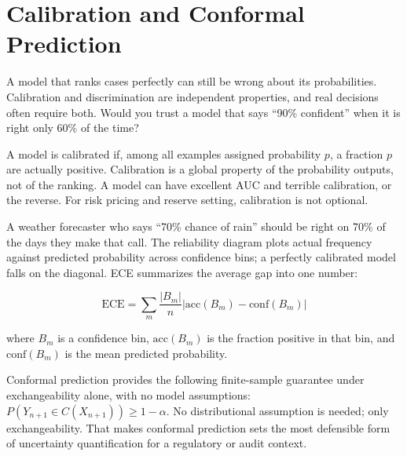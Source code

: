 \documentclass[12pt,a4paper]{article}
\begin{document}
\section*{Calibration and Conformal Prediction}

A model that ranks cases perfectly can still be wrong about its
probabilities. Calibration and discrimination are independent properties,
and real decisions often require both. Would you trust a model that says
``90\% confident'' when it is right only 60\% of the time?

\begin{concept}
A model is calibrated if, among all examples assigned probability $p$,
a fraction $p$ are actually positive. Calibration is a global property
of the probability outputs, not of the ranking. A model can have excellent
AUC and terrible calibration, or the reverse. For risk pricing and
reserve setting, calibration is not optional.
\end{concept}

\begin{analogy}
A weather forecaster who says ``70\% chance of rain'' should be right
on 70\% of the days they make that call. The reliability diagram plots
actual frequency against predicted probability across confidence bins;
a perfectly calibrated model falls on the diagonal. ECE summarizes the
average gap into one number:
\end{analogy}

\begin{equation*}
  \mathrm{ECE}
  = \sum_{m} \frac{|B_m|}{n}
    \left|\mathrm{acc}(B_m) - \mathrm{conf}(B_m)\right|
\end{equation*}

where $B_m$ is a confidence bin, $\mathrm{acc}(B_m)$ is the fraction
positive in that bin, and $\mathrm{conf}(B_m)$ is the mean predicted
probability.

\begin{mentalmodel}
Conformal prediction provides the following finite-sample guarantee under
exchangeability alone, with no model assumptions:
$P(Y_{n+1} \in C(X_{n+1})) \geq 1-\alpha$.
No distributional assumption is needed; only exchangeability. That makes
conformal prediction sets the most defensible form of uncertainty
quantification for a regulatory or audit context.
\end{mentalmodel}
\end{document}
